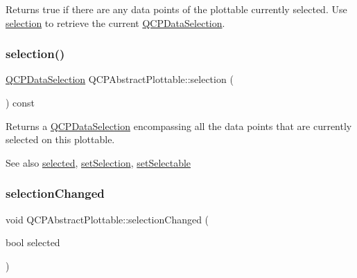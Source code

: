 Returns true if there are any data points of the plottable currently selected. Use \hyperlink{class_q_c_p_abstract_plottable_a040bf09f41d456284cfd39cc37aa068f}{selection} to retrieve the current \hyperlink{class_q_c_p_data_selection}{Q\+C\+P\+Data\+Selection}. \mbox{\label{class_q_c_p_abstract_plottable_a040bf09f41d456284cfd39cc37aa068f}} 
\subsubsection{\texorpdfstring{selection()}{selection()}}
{\footnotesize\ttfamily \hyperlink{class_q_c_p_data_selection}{Q\+C\+P\+Data\+Selection} Q\+C\+P\+Abstract\+Plottable\+::selection (\begin{DoxyParamCaption}{ }\end{DoxyParamCaption}) const\hspace{0.3cm}{\ttfamily [inline]}}

Returns a \hyperlink{class_q_c_p_data_selection}{Q\+C\+P\+Data\+Selection} encompassing all the data points that are currently selected on this plottable.

\begin{DoxySeeAlso}{See also}
\hyperlink{class_q_c_p_abstract_plottable_a0b3b514474fe93354fc74cfc144184b4}{selected}, \hyperlink{class_q_c_p_abstract_plottable_a219bc5403a9d85d3129165ec3f5ae436}{set\+Selection}, \hyperlink{class_q_c_p_abstract_plottable_ac238d6e910f976f1f30d41c2bca44ac3}{set\+Selectable} 
\end{DoxySeeAlso}
\mbox{\label{class_q_c_p_abstract_plottable_a3af66432b1dca93b28e00e78a8c7c1d9}} 
\subsubsection{\texorpdfstring{selection\+Changed}{selectionChanged}\hspace{0.1cm}{\footnotesize\ttfamily [1/2]}}
{\footnotesize\ttfamily void Q\+C\+P\+Abstract\+Plottable\+::selection\+Changed (\begin{DoxyParamCaption}\item[{bool}]{selected }\end{DoxyParamCaption})\hspace{0.3cm}{\ttfamily [signal]}}

